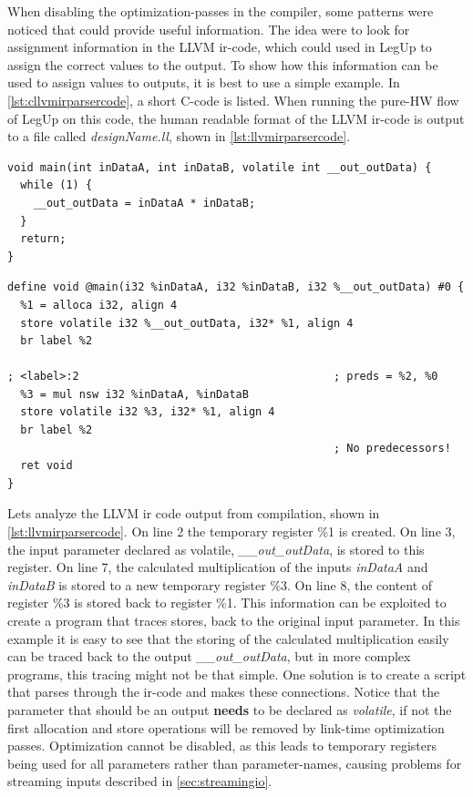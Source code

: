 When disabling the optimization-passes in the compiler, some patterns were noticed that could provide useful information. The idea were to look for assignment information in the LLVM \gls{ir}-code, which could used in LegUp to assign the correct values to the output. To show how this information can be used to assign values to outputs, it is best to use a simple example. In \cref{lst:cllvmirparsercode}, a short C-code is listed. When running the pure-HW flow of LegUp on this code, the human readable format of the LLVM \gls{ir}-code is output to a file called \textit{designName.ll}, shown in \cref{lst:llvmirparsercode}.
\clearpage
\lstset{language=C,style=Cstyle}
\begin{lstlisting}[caption={Simple C-code example for LLVM IR parsing},label=lst:cllvmirparsercode]
void main(int inDataA, int inDataB, volatile int __out_outData) {
  while (1) {
    __out_outData = inDataA * inDataB;
  }
  return;
}
\end{lstlisting}
\lstset{language=LLVM,style=LLVMStyle}
\begin{lstlisting}[caption={LLVM IR code for simple parsing example},label=lst:llvmirparsercode]
define void @main(i32 %inDataA, i32 %inDataB, i32 %__out_outData) #0 {
  %1 = alloca i32, align 4
  store volatile i32 %__out_outData, i32* %1, align 4
  br label %2

; <label>:2                                       ; preds = %2, %0
  %3 = mul nsw i32 %inDataA, %inDataB
  store volatile i32 %3, i32* %1, align 4
  br label %2
                                                  ; No predecessors!
  ret void
}
\end{lstlisting}
Lets analyze the LLVM \gls{ir} code output from compilation, shown in \cref{lst:llvmirparsercode}. On line 2 the temporary register \%1 is created. On line 3, the input parameter declared as volatile, \textit{\_\_out\_outData}, is stored to this register. On line 7, the calculated multiplication of the inputs \textit{inDataA} and \textit{inDataB} is stored to a new temporary register \%3. On line 8, the content of register \%3 is stored back to register \%1. This information can be exploited to create a program that traces stores, back to the original input parameter. In this example it is easy to see that the storing of the calculated multiplication easily can be traced back to the output \textit{\_\_out\_outData}, but in more complex programs, this tracing might not be that simple. One solution is to create a script that parses through the \gls{ir}-code and makes these connections. Notice that the parameter that should be an output \textbf{needs} to be declared as \textit{volatile}, if not the first allocation and store operations will be removed by link-time optimization passes. Optimization cannot be disabled, as this leads to temporary registers being used for all parameters rather than parameter-names, causing problems for streaming inputs described in \cref{sec:streamingio}.

